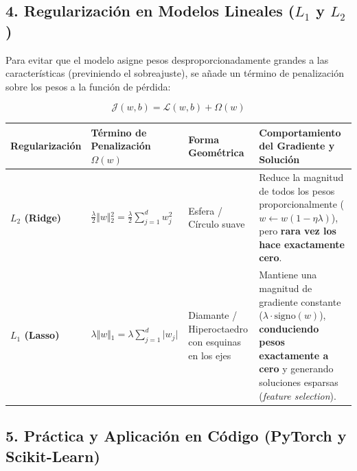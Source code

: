 \documentclass[11pt,oneside]{article}
\begin{document}
\subsection{4. Regularización en Modelos Lineales (\(L_1\) y \(L_2\))}

Para evitar que el modelo asigne pesos desproporcionadamente grandes a las características (previniendo el sobreajuste), se añade un término de penalización sobre los pesos a la función de pérdida:

\[\mathcal{J}(w, b) = \mathcal{L}(w, b) + \Omega(w)\]

\begin{center}
\begin{tabularx}{\textwidth}{>{\raggedright\arraybackslash}X >{\raggedright\arraybackslash}X >{\raggedright\arraybackslash}X >{\raggedright\arraybackslash}X}
\toprule
Regularización & Término de Penalización \(\Omega(w)\) & Forma Geométrica & Comportamiento del Gradiente y Solución \\
\midrule
\textbf{\(L_2\) (Ridge)} & \(\frac{\lambda}{2} \Vert{}w\Vert{}_2^2 = \frac{\lambda}{2} \sum_{j=1}^{d} w_j^2\) & Esfera / Círculo suave & Reduce la magnitud de todos los pesos proporcionalmente (\(w \leftarrow w(1 - \eta \lambda)\)), pero \textbf{rara vez los hace exactamente cero}. \\
\textbf{\(L_1\) (Lasso)} & \(\lambda \Vert{}w\Vert{}_1 = \lambda \sum_{j=1}^{d} \vert{}w_j\vert{}\) & Diamante / Hiperoctaedro con esquinas en los ejes & Mantiene una magnitud de gradiente constante (\(\lambda \cdot \text{signo}(w)\)), \textbf{conduciendo pesos exactamente a cero} y generando soluciones esparsas (\emph{feature selection}). \\
\bottomrule
\end{tabularx}
\end{center}

\subsection{5. Práctica y Aplicación en Código (PyTorch y Scikit-Learn)}
\end{document}
